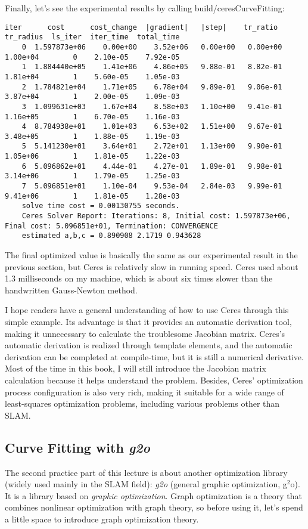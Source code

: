 Finally, let's see the experimental results by calling build/ceresCurveFitting: 
\begin{lstlisting}[caption=erminal output: ]
    iter      cost      cost_change  |gradient|   |step|    tr_ratio  tr_radius  ls_iter  iter_time  total_time
    0  1.597873e+06    0.00e+00    3.52e+06   0.00e+00   0.00e+00  1.00e+04        0    2.10e-05    7.92e-05
    1  1.884440e+05    1.41e+06    4.86e+05   9.88e-01   8.82e-01  1.81e+04        1    5.60e-05    1.05e-03
    2  1.784821e+04    1.71e+05    6.78e+04   9.89e-01   9.06e-01  3.87e+04        1    2.00e-05    1.09e-03
    3  1.099631e+03    1.67e+04    8.58e+03   1.10e+00   9.41e-01  1.16e+05        1    6.70e-05    1.16e-03
    4  8.784938e+01    1.01e+03    6.53e+02   1.51e+00   9.67e-01  3.48e+05        1    1.88e-05    1.19e-03
    5  5.141230e+01    3.64e+01    2.72e+01   1.13e+00   9.90e-01  1.05e+06        1    1.81e-05    1.22e-03
    6  5.096862e+01    4.44e-01    4.27e-01   1.89e-01   9.98e-01  3.14e+06        1    1.79e-05    1.25e-03
    7  5.096851e+01    1.10e-04    9.53e-04   2.84e-03   9.99e-01  9.41e+06        1    1.81e-05    1.28e-03
    solve time cost = 0.00130755 seconds. 
    Ceres Solver Report: Iterations: 8, Initial cost: 1.597873e+06, Final cost: 5.096851e+01, Termination: CONVERGENCE
    estimated a,b,c = 0.890908 2.1719 0.943628 
\end{lstlisting}

The final optimized value is basically the same as our experimental result in the previous section, but Ceres is relatively slow in running speed. Ceres used about 1.3 milliseconds on my machine, which is about six times slower than the handwritten Gauss-Newton method.

I hope readers have a general understanding of how to use Ceres through this simple example. Its advantage is that it provides an automatic derivation tool, making it unnecessary to calculate the troublesome Jacobian matrix. Ceres's automatic derivation is realized through template elements, and the automatic derivation can be completed at compile-time, but it is still a numerical derivative. Most of the time in this book, I will still introduce the Jacobian matrix calculation because it helps understand the problem. Besides, Ceres' optimization process configuration is also very rich, making it suitable for a wide range of least-squares optimization problems, including various problems other than SLAM.

\subsection{Curve Fitting with \textit{g2o}}
The second practice part of this lecture is about another optimization library (widely used mainly in the SLAM field): \textit{g2o} (general graphic optimization, g$^2$o). It is a library based on \textit{graphic optimization}. Graph optimization is a theory that combines nonlinear optimization with graph theory, so before using it, let's spend a little space to introduce graph optimization theory.

